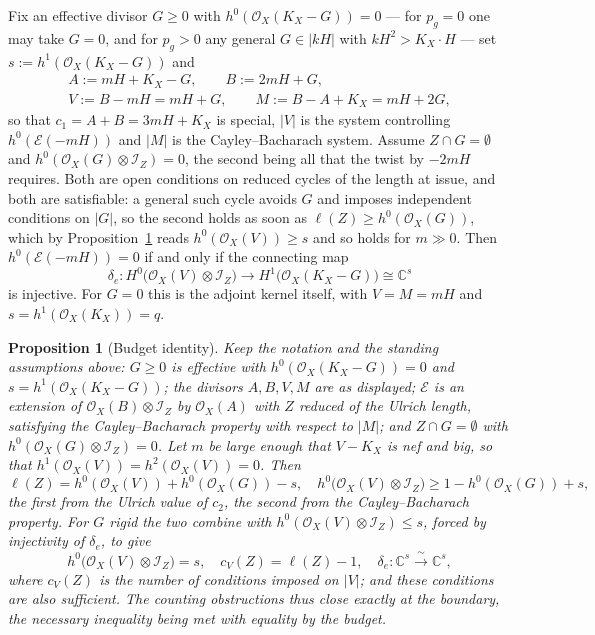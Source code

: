 \documentclass[10pt,a4paper]{amsart}
\newtheorem{proposition}[theorem]{Proposition}
\newcommand{\OO}{\mathcal{O}}
\newcommand{\EE}{\mathcal{E}}
\newcommand{\II}{\mathcal{I}}
\newcommand{\CC}{\mathbb{C}}
\newcommand{\len}{\ell}
\begin{document}
Fix an effective divisor $G\ge0$ with $h^0(\OO_X(K_X-G))=0$ --- for $p_g=0$ one may take $G=0$, and for $p_g>0$ any general $G\in|kH|$ with $kH^2>K_X\cdot H$ --- set $s:=h^1(\OO_X(K_X-G))$ and
\begin{gather*}
A:=mH+K_X-G,\qquad B:=2mH+G,\\
V:=B-mH=mH+G,\qquad M:=B-A+K_X=mH+2G ,
\end{gather*}
so that $c_1=A+B=3mH+K_X$ is special, $|V|$ is the system controlling $h^0(\EE(-mH))$ and $|M|$ is the Cayley--Bacharach system. Assume $Z\cap G=\emptyset$ and $h^0(\OO_X(G)\otimes\II_Z)=0$, the second being all that the twist by $-2mH$ requires. Both are open conditions on reduced cycles of the length at issue, and both are satisfiable: a general such cycle avoids $G$ and imposes independent conditions on $|G|$, so the second holds as soon as $\len(Z)\ge h^0(\OO_X(G))$, which by Proposition~\ref{prop:budget} reads $h^0(\OO_X(V))\ge s$ and so holds for $m\gg0$. Then $h^0(\EE(-mH))=0$ if and only if the connecting map
\[
\delta_e:H^0\bigl(\OO_X(V)\otimes\II_Z\bigr)\longrightarrow H^1\bigl(\OO_X(K_X-G)\bigr)\cong\CC^{s}
\]
is injective. For $G=0$ this is the adjoint kernel itself, with $V=M=mH$ and $s=h^1(\OO_X(K_X))=q$.

\begin{proposition}[Budget identity]\label{prop:budget}
Keep the notation and the standing assumptions above: $G\ge0$ is effective with $h^0(\OO_X(K_X-G))=0$ and $s=h^1(\OO_X(K_X-G))$; the divisors $A,B,V,M$ are as displayed; $\EE$ is an extension of $\OO_X(B)\otimes\II_Z$ by $\OO_X(A)$ with $Z$ reduced of the Ulrich length, satisfying the Cayley--Bacharach property with respect to $|M|$; and $Z\cap G=\emptyset$ with $h^0(\OO_X(G)\otimes\II_Z)=0$. Let $m$ be large enough that $V-K_X$ is nef and big, so that
$h^1(\OO_X(V))=h^2(\OO_X(V))=0$. Then
\[
\len(Z)=h^0(\OO_X(V))+h^0(\OO_X(G))-s ,\quad
h^0\bigl(\OO_X(V)\otimes\II_Z\bigr)\ge 1-h^0(\OO_X(G))+s,
\]
the first from the Ulrich value of $c_2$, the second from the Cayley--Bacharach property. For $G$ rigid the two combine with $h^0(\OO_X(V)\otimes\II_Z)\le s$, forced by injectivity of $\delta_e$, to give
\[
h^0\bigl(\OO_X(V)\otimes\II_Z\bigr)=s,\quad c_V(Z)=\len(Z)-1,\quad
\delta_e:\CC^{s}\xrightarrow{\ \sim\ }\CC^{s},
\]
where $c_V(Z)$ is the number of conditions imposed on $|V|$; and these conditions are also sufficient. The counting obstructions thus close \emph{exactly at the boundary}, the necessary inequality being met with equality by the budget.
\end{proposition}
\end{document}
